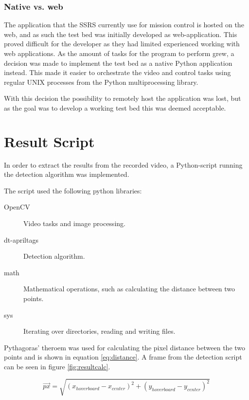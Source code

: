 \documentclass[nofilelist]{cslthse-msc}
\begin{document}
\subsubsection{Native vs. web}
The application that the SSRS currently use for mission control is hosted on the web, and as such the test bed was initially developed as web-application. This proved difficult for the developer as they had limited experienced working with web applications. As the amount of tasks for the program to perform grew, a decision was made to implement the test bed as a native Python application instead. This made it easier to orchestrate the video and control tasks using regular UNIX processes from the Python multiprocessing library. 

With this decision the possibility to remotely host the application was lost, but as the goal was to develop a working test bed this was deemed acceptable. 

\section{Result Script}
\label{sec:resultscript}
In order to extract the results from the recorded video, a Python-script running the detection algorithm was implemented. 

The script used the following python libraries:
\begin{description}
   \item[OpenCV] Video tasks and image processing.
   \item[dt-apriltags] Detection algorithm.
   \item[math] Mathematical operations, such as calculating the distance between two points.
   \item[sys] Iterating over directories, reading and writing files.  
\end{description}

Pythagoras' theroem was used for calculating the pixel distance between the two points and is shown in equation \ref{eq:distance}. A frame from the detection script can be seen in figure \ref{fig:resultcalc}.

\begin{equation}
   \label{eq:distance}
   \overrightarrow{px} = \sqrt{(x_{hoverboard} - x_{center})^2 + (y_{hoverboard} - y_{center})^2}
\end{equation}
\end{document}
